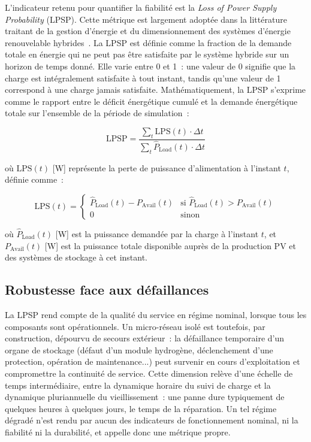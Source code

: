 L'indicateur retenu pour quantifier la fiabilité est la \textit{Loss of Power Supply Probability} (LPSP). Cette métrique est largement adoptée dans la littérature traitant de la gestion d'énergie et du dimensionnement des systèmes d'énergie renouvelable hybrides~\cite{korovushkin_modern_2025}\cite{heydari_combined_2023}. La LPSP est définie comme la fraction de la demande totale en énergie qui ne peut pas être satisfaite par le système hybride sur un horizon de temps donné. Elle varie entre 0 et 1~: une valeur de 0 signifie que la charge est intégralement satisfaite à tout instant, tandis qu'une valeur de 1 correspond à une charge jamais satisfaite. Mathématiquement, la LPSP s'exprime comme le rapport entre le déficit énergétique cumulé et la demande énergétique totale sur l'ensemble de la période de simulation~:

\begin{equation}
    \mathrm{LPSP} = \frac{\sum_{t} \mathrm{LPS}(t)\cdot \Delta t}{\sum_{t} \hat{P}_{\text{Load}}(t) \cdot \Delta t}
    \label{eq:lpsp}
\end{equation}

où $\mathrm{LPS}(t)$ [W] représente la perte de puissance d'alimentation à l'instant $t$, définie comme~:

\begin{equation}
    \mathrm{LPS}(t) =
    \begin{cases}
      \hat{P}_{\text{Load}}(t) - P_{\text{Avail}}(t) & \text{si } \hat{P}_{\text{Load}}(t) > P_{\text{Avail}}(t) \\
      0 & \text{sinon}
    \end{cases}
    \label{eq:lps}
\end{equation}

où $\hat{P}_{\text{Load}}(t)$ [W] est la puissance demandée par la charge à l'instant $t$, et $P_{\text{Avail}}(t)$ [W] est la puissance totale disponible auprès de la production PV et des systèmes de stockage à cet instant.

\subsection{Robustesse face aux défaillances}
\label{subsec:indic_robustesse}

La LPSP rend compte de la qualité du service en régime nominal, lorsque tous les composants sont opérationnels. Un micro-réseau isolé est toutefois, par construction, dépourvu de secours extérieur~: la défaillance temporaire d'un organe de stockage (défaut d'un module hydrogène, déclenchement d'une protection, opération de maintenance...) peut survenir en cours d'exploitation et compromettre la continuité de service. Cette dimension relève d'une échelle de temps intermédiaire, entre la dynamique horaire du suivi de charge et la dynamique pluriannuelle du vieillissement~: une panne dure typiquement de quelques heures à quelques jours, le temps de la réparation. Un tel régime dégradé n'est rendu par aucun des indicateurs de fonctionnement nominal, ni la fiabilité ni la durabilité, et appelle donc une métrique propre.

